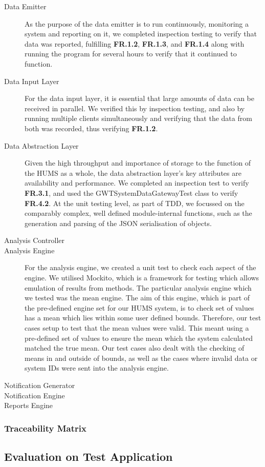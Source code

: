 \documentclass[10pt,a4paper]{article}
\newcommand{\fr}[1]{\textbf{FR.#1}}
\begin{document}

\begin{description}
  \item[Data Emitter] As the purpose of the data emitter is to run
    continuously, monitoring a system and reporting on it, we completed
    inspection testing to verify that data was reported, fulfilling \fr{1.2},
    \fr{1.3}, and \fr{1.4} along with running the program for several hours to
    verify that it continued to function.

  \item[Data Input Layer] For the data input layer, it is essential that large
    amounts of data can be received in parallel. We verified this by
    inspection testing, and also by running multiple clients simultaneously and
    verifying that the data from both was recorded, thus verifying \fr{1.2}.

  \item[Data Abstraction Layer] Given the high throughput and
    importance of storage to the function of the HUMS as a whole, the
    data abstraction layer's key attributes are availability and
    performance. We completed an inspection test to verify \textbf{FR.3.1}, 
    and used the GWTSystemDataGatewayTest class 
    to verify \textbf{FR.4.2}. At the unit testing level, as 
    part of TDD,  we focussed on the comparably complex, well defined 
    module-internal functions, such as the generation and parsing of the 
    JSON serialisation of objects.
  \item[Analysis Controller]
  \item[Analysis Engine]
  For the analysis engine, we created a unit test to check each aspect of the engine. We utilised Mockito, which is a framework for testing which allows emulation of results from methods. The particular analysis engine which we tested was the mean engine. The aim of this engine, which is part of the pre-defined engine set for our HUMS system, is to check set of values has a mean which lies within some user defined bounds. Therefore, our test cases setup to test that the mean values were valid. This meant using a pre-defined set of values to ensure the mean which the system calculated matched the true mean. Our test cases also dealt with the checking of means in and outside of bounds, as well as the cases where invalid data or system IDs were sent into the analysis engine.
  \item[Notification Generator]
  \item[Notification Engine]
  \item[Reports Engine]
 \end{description}
 \subsubsection{Traceability Matrix}

\subsection{Evaluation on Test Application}








\vfill


\end{document}
